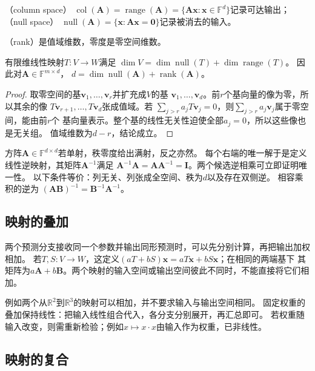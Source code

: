 （column space）
$\operatorname{col}(\bm A)=\operatorname{range}(\bm A)
=\{\bm A\bm x:\bm x\in\mathbb F^d\}$记录可达输出；
（null space）
$\operatorname{null}(\bm A)=\{\bm x:\bm A\bm x=\bm0\}$记录被消去的输入。

（rank）是值域维数，零度是零空间维数。
\begin{theorem}[秩零度定理]
\label{thm:linear-algebra-rank-nullity}
有限维线性映射$T:V\to W$满足
$\dim V=\dim\operatorname{null}(T)+\dim\operatorname{range}(T)$。
因此对$\bm A\in\mathbb F^{m\times d}$，
$d=\dim\operatorname{null}(\bm A)+\operatorname{rank}(\bm A)$。
\end{theorem}
\begin{proof}
取零空间的基$\bm v_1,\ldots,\bm v_r$并扩充成$V$的基
$\bm v_1,\ldots,\bm v_d$。前$r$个基向量的像为零，所以其余的像
$T\bm v_{r+1},\ldots,T\bm v_d$张成值域。若
$\sum_{j>r}a_jT\bm v_j=0$，则$\sum_{j>r}a_j\bm v_j$属于零空间，能由前$r$个
基向量表示。整个基的线性无关性迫使全部$a_j=0$，所以这些像也是无关组。
值域维数为$d-r$，结论成立。
\end{proof}


方阵$\bm A\in\mathbb F^{d\times d}$若单射，秩零度给出满射，反之亦然。
每个右端的唯一解于是定义线性逆映射，其矩阵$\bm A^{-1}$满足
$\bm A^{-1}\bm A=\bm A\bm A^{-1}=\bm I$。两个候选逆相乘可立即证明唯一性。
以下条件等价：列无关、列张成全空间、秩为$d$以及存在双侧逆。
相容乘积的逆为
$(\bm A\bm B)^{-1}=\bm B^{-1}\bm A^{-1}$。

\subsection{映射的叠加}
\label{sec:linear-algebra-map-addition}

两个预测分支接收同一个参数并输出同形预测时，可以先分别计算，再把输出加权相加。
若$T,S:V\to W$，这定义$(aT+bS)\bm x=aT\bm x+bS\bm x$；在相同的两端基下
其矩阵为$a\bm A+b\bm B$。两个映射的输入空间或输出空间彼此不同时，不能直接将它们相加。



例如两个从$\mathbb R^2$到$\mathbb R^3$的映射可以相加，并不要求输入与输出空间相同。
固定权重的叠加保持线性：把输入线性组合代入，各分支分别展开，再汇总即可。
若权重随输入改变，则需重新检验；例如$x\mapsto x\cdot x$由输入作为权重，已非线性。

\subsection{映射的复合}
\label{sec:linear-algebra-map-composition}

